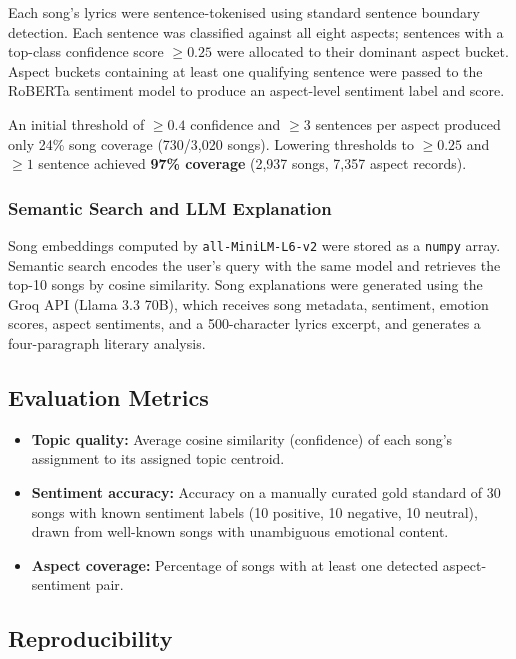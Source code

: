 \documentclass[pdflatex,sn-mathphys-num]{sn-jnl}
\begin{document}
Each song's lyrics were sentence-tokenised using standard sentence boundary detection. Each sentence was classified against all eight aspects; sentences with a top-class confidence score $\geq 0.25$ were allocated to their dominant aspect bucket. Aspect buckets containing at least one qualifying sentence were passed to the RoBERTa sentiment model to produce an aspect-level sentiment label and score.

An initial threshold of $\geq 0.4$ confidence and $\geq 3$ sentences per aspect produced only 24\% song coverage (730/3,020 songs). Lowering thresholds to $\geq 0.25$ and $\geq 1$ sentence achieved \textbf{97\% coverage} (2,937 songs, 7,357 aspect records).

\subsubsection{Semantic Search and LLM Explanation}\label{subsubsec5}

Song embeddings computed by \texttt{all-MiniLM-L6-v2} were stored as a \texttt{numpy} array. Semantic search encodes the user's query with the same model and retrieves the top-10 songs by cosine similarity. Song explanations were generated using the Groq API (Llama 3.3 70B), which receives song metadata, sentiment, emotion scores, aspect sentiments, and a 500-character lyrics excerpt, and generates a four-paragraph literary analysis.

\subsection{Evaluation Metrics}\label{subsec6}

\begin{itemize}[noitemsep]
    \item \textbf{Topic quality:} Average cosine similarity (confidence) of each song's assignment to its assigned topic centroid.
    \item \textbf{Sentiment accuracy:} Accuracy on a manually curated gold standard of 30 songs with known sentiment labels (10 positive, 10 negative, 10 neutral), drawn from well-known songs with unambiguous emotional content.
    \item \textbf{Aspect coverage:} Percentage of songs with at least one detected aspect-sentiment pair.
\end{itemize}

\subsection{Reproducibility}\label{subsec7}
\end{document}
